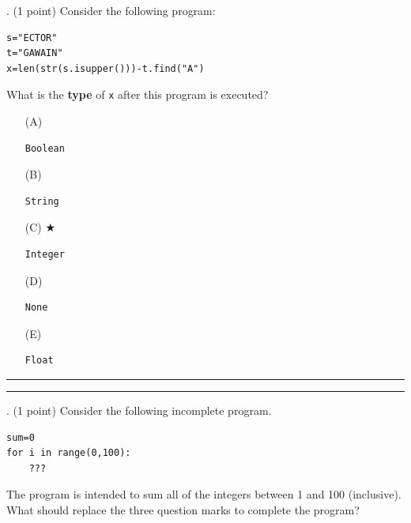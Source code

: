 \documentclass{article}
\newcounter{question}
\begin{document}
\newpage






\newpage
{}. (1 point)
Consider the following program:
\begin{verbatim}
s="ECTOR"
t="GAWAIN"
x=len(str(s.isupper()))-t.find("A")
\end{verbatim}
What is the \textbf{type} of \texttt{x} after this program is executed?


\begin{enumerate}
\item[(A)]
\begin{verbatim}Boolean\end{verbatim}

\item[(B)]
\begin{verbatim}String\end{verbatim}

\item[(C)] $\bigstar$ 
\begin{verbatim}Integer\end{verbatim}

\item[(D)]
\begin{verbatim}None\end{verbatim}

\item[(E)]
\begin{verbatim}Float\end{verbatim}

\end{enumerate}

\vspace*{2em}
\hrule
\vspace{2em}

\vspace{2em}
\hrule height 2pt


\newpage
{}. (1 point)
Consider the following incomplete program.
\begin{verbatim}
sum=0
for i in range(0,100):
    ???

\end{verbatim}
The program is intended to sum all of the integers between 1 and 100 (inclusive). What should replace the three question marks to complete the program?
\end{document}
